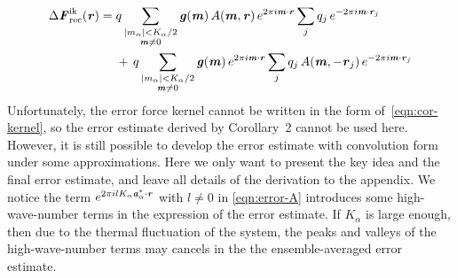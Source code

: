 \documentclass[journal=jacsat,manuscript=article]{achemso}
\renewcommand{\v}[1]{\textbf{\textit{#1}}}
\begin{document}
\begin{align}\nonumber
  \Delta\v F_{\textrm{rec}}^{\textrm{ik}}(\v r)
  =\;&
  q
  \sum_{
    \begin{subarray}{c}
      \vert m_{\alpha}\vert < K_\alpha/2\\
      \v m\neq 0
    \end{subarray}}
  \v g(\v m)\,
  A(\v m, \v r)\,
  e^{2\pi i\v m\cdot \v r}
  \sum_{j}q_j\,e^{-2\pi i\v m\cdot\v r_j} \\\label{eqn:ik.error.force}
  & +\,
  q
  \sum_{
    \begin{subarray}{c}
      \vert m_{\alpha}\vert < K_\alpha/2\\
      \v m\neq 0
    \end{subarray}}
  \v g(\v m)\,
  e^{2\pi i\v m\cdot \v r}
  \sum_{j}q_j\,A(\v m, -\v r_j)\,e^{-2\pi i\v m\cdot\v r_j}
\end{align}
Unfortunately, the
error force kernel
cannot be written
in the form of~\ref{eqn:cor-kernel}, so the error estimate derived by
Corollary~2
cannot be used here. However, it is still
possible to develop the error estimate with convolution form under
some approximations.
Here we only want to present the key idea and the final  error
estimate, and leave all details of the derivation 
to the appendix.  We notice the
term $e^{2\pi i l K_\alpha\v a^\ast_\alpha\cdot\v r}$ with $l\neq 0$
in \ref{eqn:error-A} introduces some high-wave-number terms in
the expression of the error estimate.  If $K_\alpha$ is large enough,
then due to the thermal fluctuation of the system, the peaks and
valleys of the high-wave-number terms may cancels in the the
ensemble-averaged error estimate.
\end{document}
